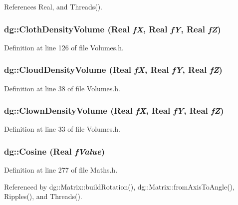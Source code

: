 References Real, and Threads().
\subsubsection{ dg::Cloth\-Density\-Volume ({\bf Real} {\em f\-X}, {\bf Real} {\em f\-Y}, {\bf Real} {\em f\-Z})\hspace{0.3cm}{\tt  [inline]}}\label{namespacedg_a200}




Definition at line 126 of file Volumes.h.
\subsubsection{ dg::Cloud\-Density\-Volume ({\bf Real} {\em f\-X}, {\bf Real} {\em f\-Y}, {\bf Real} {\em f\-Z})\hspace{0.3cm}{\tt  [inline]}}\label{namespacedg_a191}




Definition at line 38 of file Volumes.h.
\subsubsection{ dg::Clown\-Density\-Volume ({\bf Real} {\em f\-X}, {\bf Real} {\em f\-Y}, {\bf Real} {\em f\-Z})\hspace{0.3cm}{\tt  [inline]}}\label{namespacedg_a190}




Definition at line 33 of file Volumes.h.
\subsubsection{ dg::Cosine ({\bf Real} {\em f\-Value})\hspace{0.3cm}{\tt  [inline]}}\label{namespacedg_a115}




Definition at line 277 of file Maths.h.

Referenced by dg::Matrix::build\-Rotation(), dg::Matrix::from\-Axis\-To\-Angle(), Ripples(), and Threads().
